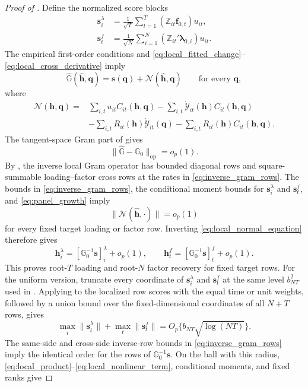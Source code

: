 \documentclass[11pt]{article}
\numberwithin{equation}{section}
\theoremstyle{remark}
\newcommand{\op}{\operatorname{op}}
\begin{document}
\begin{proof}[Proof of ]
Define the normalized score blocks
\begin{align*}
\bm s_i^\lambda
&=
\frac1{\sqrt T}
\sum_{t=1}^{T}
(\mathbb Z_{it}\bm f_{0,t})u_{it},\\
\bm s_t^f
&=
\frac1{\sqrt N}
\sum_{i=1}^{N}
(\mathbb Z_{it}'\bm\lambda_{0,i})u_{it}.
\end{align*}
The empirical first-order conditions and \eqref{eq:local_fitted_change}--\eqref{eq:local_cross_derivative} imply
\begin{equation}
\label{eq:local_normal_equation}
\widehat{\mathbb G}(\widehat{\bm h},\bm q)
=
\bm s(\bm q)
+
\mathcal N(\widehat{\bm h},\bm q)
\qquad
\text{for every }\bm q,
\end{equation}
where
\begin{align}
\mathcal N(\bm h,\bm q)
={}&
\sum_{i,t}
u_{it}C_{it}(\bm h,\bm q)
-
\sum_{i,t}
\dot{\mathcal Y}_{it}(\bm h)C_{it}(\bm h,\bm q)
\nonumber\\
&-
\sum_{i,t}
R_{it}(\bm h)\dot{\mathcal Y}_{it}(\bm q)
-
\sum_{i,t}
R_{it}(\bm h)C_{it}(\bm h,\bm q).
\label{eq:local_nonlinear_term}
\end{align}
The tangent-space Gram part of  gives
$$
\|\widehat{\mathbb G}-\mathbb G_0\|_{\op}=o_p(1).
$$
By , the inverse local Gram operator has bounded diagonal rows and square-summable loading--factor cross rows at the rates in \eqref{eq:inverse_gram_rows}. The bounds in \eqref{eq:inverse_gram_rows}, the conditional moment bounds for $\bm s_i^\lambda$ and $\bm s_t^f$, and \eqref{eq:panel_growth} imply
$$
\|\mathcal N(\widehat{\bm h},\cdot)\|
=
o_p(1)
$$
for every fixed target loading or factor row. Inverting \eqref{eq:local_normal_equation} therefore gives
\begin{equation}
\label{eq:pointwise_factor_expansion}
\bm h_i^\lambda
=
[\mathbb G_0^{-1}\bm s]_i^\lambda+o_p(1),
\qquad
\bm h_t^f
=
[\mathbb G_0^{-1}\bm s]_t^f+o_p(1).
\end{equation}
This proves root-$T$ loading and root-$N$ factor recovery for fixed target rows. For the uniform version, truncate every coordinate of $\bm s_i^\lambda$ and $\bm s_t^f$ at the same level $b_{NT}^2$ used in . Applying  to the localized row scores with the equal time or unit weights, followed by a union bound over the fixed-dimensional coordinates of all $N+T$ rows, gives
$$
\max_i\|\bm s_i^\lambda\|
+
\max_t\|\bm s_t^f\|
=
O_p\{b_{NT}\sqrt{\log(NT)}\}.
$$
The same-side and cross-side inverse-row bounds in \eqref{eq:inverse_gram_rows} imply the identical order for the rows of $\mathbb G_0^{-1}\bm s$. On the ball with this radius, \eqref{eq:local_product}--\eqref{eq:local_nonlinear_term}, conditional moments, and fixed ranks give

\end{proof}
\end{document}
